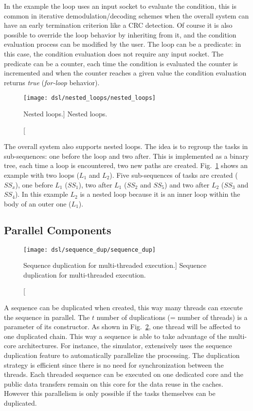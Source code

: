 In the example the loop uses an input socket to evaluate the condition, this is
common in iterative demodulation/decoding schemes when the overall system can
have an early termination criterion like a CRC detection. Of course it is also
possible to override the loop behavior by inheriting from it, and the condition
evaluation process can be modified by the user. The loop can be a predicate: in
this case, the condition evaluation does not require any input socket. The
predicate can be a counter, each time the condition is evaluated the counter is
incremented and when the counter reaches a given value the condition evaluation
returns \emph{true} (\emph{for-loop} behavior).

\begin{figure}[htp]
  \centering
  \texttt{[image: dsl/nested\_loops/nested\_loops]}
  \caption
    [Nested loops.]
    {Nested loops.}
  \label{fig:dsl_nested_loops}
\end{figure}

The overall system also supports nested loops. The idea is to regroup the tasks
in sub-sequences: one before the loop and two after. This is implemented as a
binary tree, each time a loop is encountered, two new paths are created.
Fig.~\ref{fig:dsl_nested_loops} shows an example with two loops ($L_1$ and
$L_2$). Five sub-sequences of tasks are created ($SS_x$), one before $L_1$
($SS_1$), two after $L_1$ ($SS_2$ and $SS_5$) and two after $L_2$ ($SS_3$ and
$SS_4$). In this example $L_2$ is a nested loop because it is an inner loop
within the body of an outer one ($L_1$).

\subsection{Parallel Components}

\begin{figure}[htp]
  \centering
  \texttt{[image: dsl/sequence\_dup/sequence\_dup]}
  \caption
    [Sequence duplication for multi-threaded execution.]
    {Sequence duplication for multi-threaded execution.}
  \label{fig:dsl_sequence_dup}
\end{figure}

A sequence can be duplicated when created, this way many threads can execute the
sequence in parallel. The $t$ number of duplications (= number of threads) is a
parameter of its constructor. As shown in Fig.~\ref{fig:dsl_sequence_dup}, one
thread will be affected to one duplicated chain. This way a sequence is able to
take advantage of the multi-core architectures. For instance, the \AFFECT
simulator, extensively uses the sequence duplication feature to automatically
parallelize the processing. The duplication strategy is efficient since there
is no need for synchronization between the threads. Each threaded sequence can
be executed on one dedicated core and the public data transfers remain on this
core for the data reuse in the caches. However this parallelism is only possible
if the tasks themselves can be duplicated.

